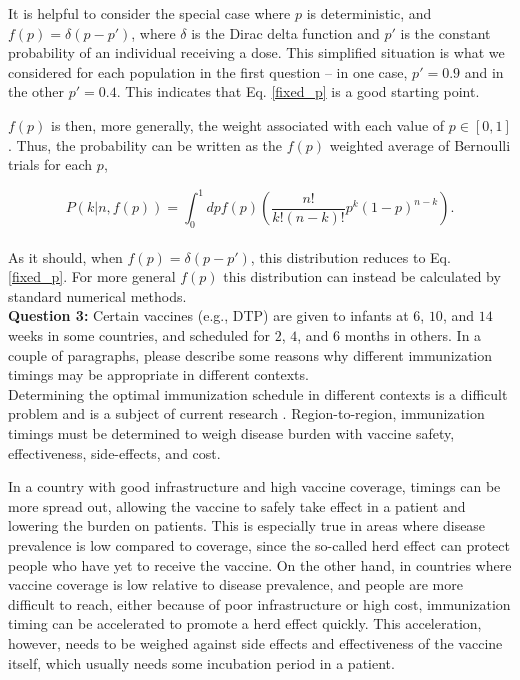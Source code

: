 \documentclass[prl,onecolumn,amsmath,amssymb,superscriptaddress,notitlepage]{revtex4-1}
\begin{document}
It is helpful to consider the special case where $p$ is deterministic, and $f(p)=\delta(p-p')$, where $\delta$ is the Dirac delta function and $p'$ is the constant probability of an individual receiving a dose. This simplified situation is what we considered for each population in the first question -- in one case, $p'=0.9$ and in the other $p'=0.4$. This indicates that Eq. \ref{fixed_p} is a good starting point.

$f(p)$ is then, more generally, the weight associated with each value of $p\in[0,1]$. Thus, the probability can be written as the $f(p)$ weighted average of Bernoulli trials for each $p$,

\begin{equation}
P(k|n,f(p)) = \int_0^1 dp f(p)\left(\frac{n!}{k!(n-k)!}p^k(1-p)^{n-k} \right).
\end{equation}
\\
As it should, when $f(p)=\delta(p-p')$, this distribution reduces to Eq. \ref{fixed_p}. For more general $f(p)$ this distribution can instead be calculated by standard numerical methods. 
\\

{\color{myred}\textbf{Question 3:} Certain vaccines (e.g., DTP) are given to infants at $6$, $10$, and $14$ weeks in some countries, and scheduled for $2$, $4$, and $6$ months in others.  In a couple of paragraphs, please describe some reasons why different immunization timings may be appropriate in different contexts.}
\\

Determining the optimal immunization schedule in different contexts is a difficult problem and is a subject of current research \cite{gentile2010,cunliffe2016}. Region-to-region, immunization timings must be determined to weigh disease burden with vaccine safety, effectiveness, side-effects, and cost. 

In a country with good infrastructure and high vaccine coverage, timings can be more spread out, allowing the vaccine to safely take effect in a patient and lowering the burden on patients. This is especially true in areas where disease prevalence is low compared to coverage, since the so-called herd effect can protect people who have yet to receive the vaccine. On the other hand, in countries where vaccine coverage is low relative to disease prevalence, and people are more difficult to reach, either because of poor infrastructure or high cost, immunization timing can be accelerated to promote a herd effect quickly. This acceleration, however, needs to be weighed against side effects and effectiveness of the vaccine itself, which usually needs some incubation period in a patient.
\\
\end{document}
